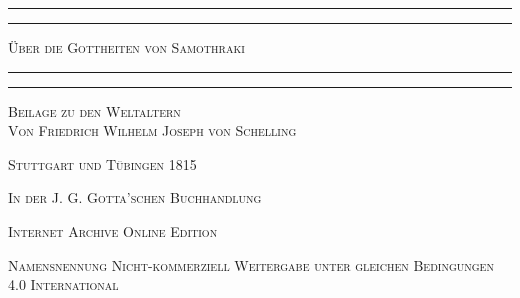 \documentclass[a4paper, 11pt, oneside]{article}
\begin{document}
\renewcommand\thefootnote{{\color{White}{\arabic{footnote}}}}
\let\oldfootnote\footnote
    \renewcommand{\footnote}[1]{\oldfootnote{{\color{White}#1}}}
\begin{titlepage} %
	\centering %

	
	\rule{\textwidth}{1.6pt}\vspace*{-\baselineskip}\vspace*{2pt} %
	\rule{\textwidth}{0.4pt} %
	
	\vspace{1\baselineskip} %
	
	{\scshape\Huge Über die Gottheiten von Samothraki}
	
	\vspace{1\baselineskip} %

	\rule{\textwidth}{0.4pt}\vspace*{-\baselineskip}\vspace{3.2pt} %
	\rule{\textwidth}{1.6pt} %
	
	\vspace{1\baselineskip} %
	
	
	{\scshape \Large Beilage zu den Weltaltern \\Von \LARGE Friedrich Wilhelm Joseph von Schelling} %
	
	\vspace*{1\baselineskip} %
	    
        \vspace*{\fill}

	\vspace{1\baselineskip}

	{\small\scshape Stuttgart und Tübingen 1815}
	
	{\small\scshape{In der J. G. Gotta'schen Buchhandlung}}
	
	\vspace{0.5\baselineskip} %

        \scshape Internet Archive Online Edition  %
	
	{\scshape\small Namensnennung Nicht-kommerziell Weitergabe unter gleichen Bedingungen 4.0 International} %
\end{titlepage}
\setlength{\parskip}{1mm plus1mm minus1mm}
\clearpage
\tableofcontents
\clearpage
\end{document}
